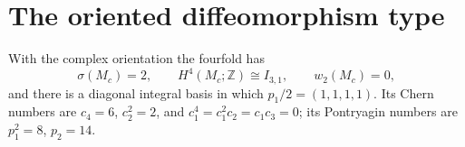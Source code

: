 \section{The oriented diffeomorphism type}

\begin{theorem}\hypertarget{tag-02QM}{}\label{night:P1.13}
With the complex orientation the fourfold has
\[
\sigma(M_c)=2,\qquad H^4(M_c;\mathbb Z)\cong I_{3,1},\qquad
w_2(M_c)=0,
\]
and there is a diagonal integral basis in which
$p_1/2=(1,1,1,1)$.
Its Chern numbers are
$c_4=6$, $c_2^2=2$, and
$c_1^4=c_1^2c_2=c_1c_3=0$; its Pontryagin numbers are
$p_1^2=8$, $p_2=14$.
\end{theorem}
